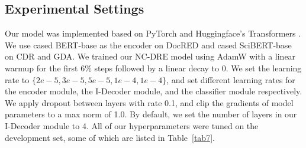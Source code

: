 \documentclass[sigconf,natbib=true]{acmart}
\begin{document}
\begin{table}[t]
\centering
{}
\caption{\label{tab6} Summary of DocRED, CDR and GDA datasets.
}
\end{table}

\subsection{Experimental Settings}
Our model was implemented based on PyTorch and Huggingface's Transformers \cite{c:120}. 
We use cased BERT-base \cite{c:124} as the encoder on DocRED and cased SciBERT-base \cite{c:126} on CDR and GDA.
We trained our NC-DRE model using AdamW \cite{c:127} with a linear warmup \cite{c:128} for the first 6\% steps followed by a linear decay to 0.
We set the learning rate to $\{2e{-}5, 3e{-}5, 5e{-}5, 1e{-}4, 1e{-}4\}$, and set different learning rates for the encoder module, the I-Decoder module, and the classifier module respectively.
We apply dropout\cite{c:2} between layers with rate 0.1, and clip the gradients of model parameters to a max norm of 1.0. 
By default, we set the number of layers in our I-Decoder module to 4.
All of our hyperparameters were tuned on the development set, some of which are listed in Table~\ref{tab7}.
\end{document}
